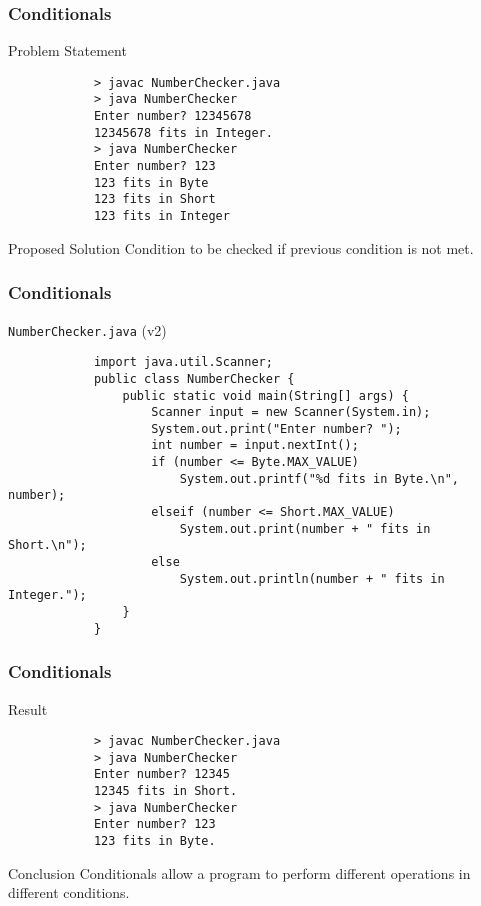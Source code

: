 \documentclass[10pt, compress]{beamer}
\begin{document}
\begin{frame}[fragile]
	\frametitle{Conditionals}
	\begin{block}{Problem Statement}
		\begin{verbatim}
			> javac NumberChecker.java
			> java NumberChecker
			Enter number? 12345678
			12345678 fits in Integer.
			> java NumberChecker
			Enter number? 123
			123 fits in Byte
			123 fits in Short
			123 fits in Integer
		\end{verbatim}
	\end{block}
	\begin{block}{Proposed Solution}
		Condition to be checked if previous condition is not met.
	\end{block}
\end{frame}

\begin{frame}[fragile]
	\frametitle{Conditionals}
	\begin{block}{\texttt{NumberChecker.java} (v2)}
		\begin{verbatim}
			import java.util.Scanner;
			public class NumberChecker {
			    public static void main(String[] args) {
			        Scanner input = new Scanner(System.in);
			        System.out.print("Enter number? ");
			        int number = input.nextInt();
			        if (number <= Byte.MAX_VALUE)
			            System.out.printf("%d fits in Byte.\n", number);
			        elseif (number <= Short.MAX_VALUE)
			            System.out.print(number + " fits in Short.\n");
			        else
			            System.out.println(number + " fits in Integer.");
			    }
			}
		\end{verbatim}
	\end{block}
\end{frame}

\begin{frame}[fragile]
	\frametitle{Conditionals}
	\begin{block}{Result}
		\begin{verbatim}
			> javac NumberChecker.java
			> java NumberChecker
			Enter number? 12345
			12345 fits in Short.
			> java NumberChecker
			Enter number? 123
			123 fits in Byte.
		\end{verbatim}
	\end{block}
	\begin{block}{Conclusion}
		Conditionals allow a program to perform different operations in different conditions.
	\end{block}
\end{frame}
\end{document}
